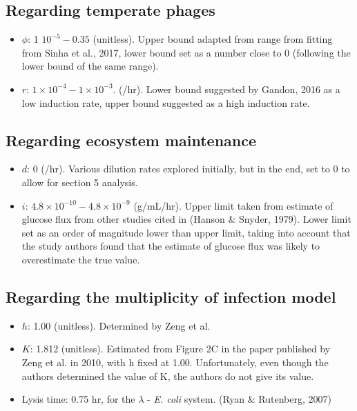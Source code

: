 \documentclass{article}
\begin{document}
\subsection{Regarding temperate phages}
\begin{itemize}
\item $\phi$: 1 \times $10^{-5} - 0.35$ (unitless). Upper bound adapted from range from fitting from Sinha et al., 2017, lower bound set as a number close to 0 (following the lower bound of the same range). 

\item $r$: $1 \times 10^{-4} - 1 \times 10^{-3}$. (/hr). Lower bound suggested by Gandon, 2016 as a low induction rate, upper bound suggested as a high induction rate. 
\end{itemize}

\subsection{Regarding ecosystem maintenance}
\begin{itemize}
\item $d$: 0 (/hr). Various dilution rates explored initially, but in the end, set to 0 to allow for section 5 analysis.

\item $i$: $4.8 \times 10^{-10} - 4.8 \times 10^{-9}$ (g/mL/hr). Upper limit taken from estimate of glucose flux from other studies cited in (Hanson $\&$ Snyder, 1979). Lower limit set as an order of magnitude lower than upper limit, taking into account that the study authors found that the estimate of glucose flux was likely to overestimate the true value.
\end{itemize}

\subsection{Regarding the multiplicity of infection model}
\begin{itemize}
\item $h$: 1.00 (unitless). Determined by Zeng et al.
\item $K$: 1.812 (unitless). Estimated from Figure 2C in the paper published by Zeng et al. in 2010, with h fixed at 1.00. Unfortunately, even though the authors determined the value of K, the authors do not give its value.
\item Lysis time: 0.75 hr, for the $\lambda$ - \textit{E. coli} system. (Ryan $\&$ Rutenberg, 2007)
\end{itemize}
\end{document}
